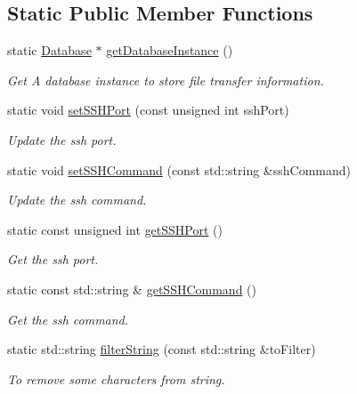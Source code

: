 \subsection*{Static Public Member Functions}
\begin{DoxyCompactItemize}
\item 
static \hyperlink{classDatabase}{Database} $\ast$ \hyperlink{classFileTransferServer_a098c41a68962d23c89de533db7e4bc1b}{getDatabaseInstance} ()
\begin{DoxyCompactList}\small\item\em Get A database instance to store file transfer information. \item\end{DoxyCompactList}\item 
static void \hyperlink{classFileTransferServer_a9508d87be5880b7dc3fba61738815e70}{setSSHPort} (const unsigned int sshPort)
\begin{DoxyCompactList}\small\item\em Update the ssh port. \item\end{DoxyCompactList}\item 
static void \hyperlink{classFileTransferServer_a8cb07d4d9d4235dabcc333c9f6bdff03}{setSSHCommand} (const std::string \&sshCommand)
\begin{DoxyCompactList}\small\item\em Update the ssh command. \item\end{DoxyCompactList}\item 
static const unsigned int \hyperlink{classFileTransferServer_aaee462f295558e3a8a09f9665cceae50}{getSSHPort} ()
\begin{DoxyCompactList}\small\item\em Get the ssh port. \item\end{DoxyCompactList}\item 
static const std::string \& \hyperlink{classFileTransferServer_aed4fb1bbcb4a41dcdc2948ad16841da3}{getSSHCommand} ()
\begin{DoxyCompactList}\small\item\em Get the ssh command. \item\end{DoxyCompactList}\item 
static std::string \hyperlink{classFileTransferServer_a97fb412a9ccaedab645d1ee13376cd4f}{filterString} (const std::string \&toFilter)
\begin{DoxyCompactList}\small\item\em To remove some characters from string. \item\end{DoxyCompactList}\item 

\end{DoxyCompactItemize}
